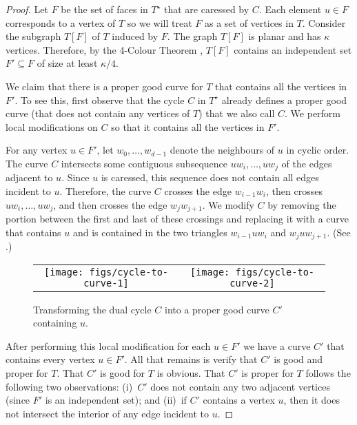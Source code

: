 \documentclass[a4paper,UKenglish]{socg-lipics-v2019}
\newcommand{\dual}[1]{{#1}^\star}
\begin{document}
\begin{proof}
  Let $F$ be the set of faces in $\dual{T}$ that are caressed by $C$. Each
  element $u\in F$ corresponds to a vertex of $T$ so we will treat $F$ as
  a set of vertices in $T$.  Consider the subgraph $T[F]$ of $T$ induced
  by $F$.  The graph $T[F]$ is planar and has $\kappa$ vertices. Therefore,
  by the 4-Colour Theorem \cite{robertson.seymour.ea:four-colour}, $T[F]$
  contains an independent set $F'\subseteq F$ of size at least $\kappa/4$.

  We claim that there is a proper good curve for $T$ that contains all
  the vertices in $F'$.  To see this, first observe that the cycle $C$ in
  $\dual{T}$ already defines a proper good curve (that does not contain
  any vertices of $T$) that we also call $C$.  We perform
  local modifications on $C$ so that it contains all the vertices in $F'$.

  For any vertex $u\in F'$, let $w_0,\ldots,w_{d-1}$ denote the neighbours
  of $u$ in cyclic order.  The curve $C$ intersects some contiguous
  subsequence $uw_i,\ldots,uw_j$ of the edges adjacent to $u$.  Since $u$
  is caressed, this sequence does not contain all edges incident
  to $u$. Therefore, the curve $C$ crosses the edge $w_{i-1}w_i$, then
  crosses $uw_i,\ldots,uw_j$, and then crosses the edge $w_j w_{j+1}$.
  We modify $C$ by removing the portion between the first and last of
  these crossings and replacing it with a curve that contains $u$ and is
  contained in the two triangles $w_{i-1}uw_i$ and $w_juw_{j+1}$. (See
  .)

  \begin{figure}
     \begin{center}
	\begin{tabular}{cc}
		\texttt{[image: figs/cycle-to-curve-1]} &
		\texttt{[image: figs/cycle-to-curve-2]}
	\end{tabular}
     \end{center}
     \caption{Transforming the dual cycle $C$ into a proper good curve $C'$ containing $u$.}
  \end{figure}

  After performing this local modification for each $u\in F'$ we have
  a curve $C'$ that contains every vertex $u\in F'$.  All that remains
  is verify that $C'$ is good and proper for $T$. That $C'$ is good for
  $T$ is obvious.  That $C'$ is proper for $T$ follows the following two
  observations: (i)~$C'$ does not contain any two adjacent vertices (since
  $F'$ is an independent set); and (ii)~if $C'$ contains a vertex $u$,
  then it does not intersect the interior of any edge incident to $u$.
\end{proof}
\end{document}
